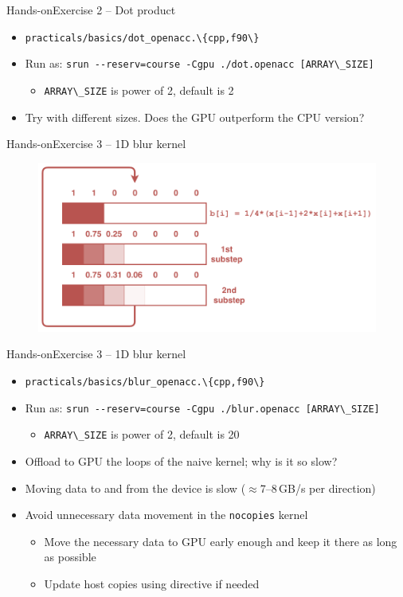 \documentclass[12pt,aspectratio=169]{beamer}
\newcommand\shinline[2][]{\lstinline[style=shstyle,basicstyle=\ttfamily,#1]!#2!}
\begin{document}
\begin{frame}{Hands-on}{Exercise 2 -- Dot product}
  \begin{itemize}
  \item \shinline{practicals/basics/dot_openacc.\{cpp,f90\}}
  \item Run as: \shinline{srun --reserv=course -Cgpu ./dot.openacc [ARRAY\_SIZE]}
    \begin{itemize}
    \item \shinline{ARRAY\_SIZE} is power of 2, default is 2
    \end{itemize}
  \item Try with different sizes. Does the GPU outperform the CPU version?
  \end{itemize}
\end{frame}

\begin{frame}{Hands-on}{Exercise 3 -- 1D blur kernel}
  \begin{figure}
    \centering
    \includegraphics[width=.7\textwidth]{blur_twice_kernel}
  \end{figure}
\end{frame}


\begin{frame}{Hands-on}{Exercise 3 -- 1D blur kernel}
  \begin{itemize}
  \item \shinline{practicals/basics/blur_openacc.\{cpp,f90\}}
  \item Run as: \shinline{srun --reserv=course -Cgpu ./blur.openacc [ARRAY\_SIZE]}
    \begin{itemize}
    \item \shinline{ARRAY\_SIZE} is power of 2, default is 20
    \end{itemize}
  \item Offload to GPU the loops of the naive kernel; why is it so slow?
    \pause
    \vfill
  \item Moving data to and from the device is slow ($\approx$7--8\,GB/s per direction)
  \item Avoid unnecessary data movement in the \texttt{nocopies} kernel
    \begin{itemize}
    \item Move the necessary data to GPU early enough and keep it there as long as possible
    \item Update host copies using  directive if needed
    \end{itemize}
  \end{itemize}
\end{frame}
\end{document}
